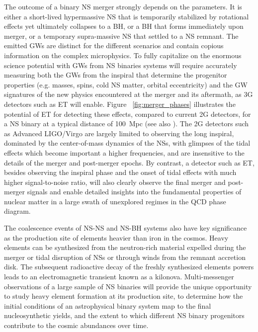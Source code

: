 The outcome of a binary NS merger strongly depends on the parameters. It is either a short-lived hypermassive NS that is temporarily stabilized by rotational effects yet ultimately collapses to a BH, or a BH that forms immediately upon merger, or a temporary supra-massive NS that settled to a NS remnant. The emitted GWs are distinct for the different scenarios and contain copious information on the complex microphysics. To fully capitalize on the enormous science potential with GWs from NS binaries systems will require accurately measuring both the GWs from the inspiral that determine the progenitor properties (e.g. masses, spins, cold NS matter, orbital eccentricity) and the GW signatures of the new physics encountered at the merger and its aftermath, as 3G detectors such as ET will enable. Figure ~\ref{fig:merger_phases} illustrates the potential of ET for detecting these effects, compared to current 2G detectors, for a NS binary at a typical distance of 100~Mpc (see also \cite{Andersson:2017kru}). The 2G detectors such as Advanced LIGO/Virgo are largely limited to observing the long inspiral, dominated by the center-of-mass dynamics of the NSs, with glimpses of the tidal effects which become important a higher frequencies, and are insensitive to the details of the merger and post-merger epochs. By contrast, a detector such as ET, besides observing the inspiral phase and the onset of tidal effects with much higher signal-to-noise ratio, will also clearly observe the final merger and post-merger signals and enable detailed insights into the fundamental properties of nuclear matter in a large swath of unexplored regimes in the QCD phase diagram. 

The coalescence events of NS-NS and NS-BH systems also have key significance as the production site of elements heavier than iron in the cosmos. Heavy elements can be synthesized from the neutron-rich material expelled during the merger or tidal disruption of NSs or through winds from the remnant accretion disk. The subsequent radioactive decay of the freshly synthesized elements powers leads to an electromagnetic transient known as a kilonova. Multi-messenger observations of a large sample of NS binaries will provide the unique opportunity to study heavy element formation at its production site, to determine how the initial conditions of an astrophysical binary system map to the final nucleosynthetic yields, and the extent to which different NS binary progenitors contribute to the cosmic abundances over time.


